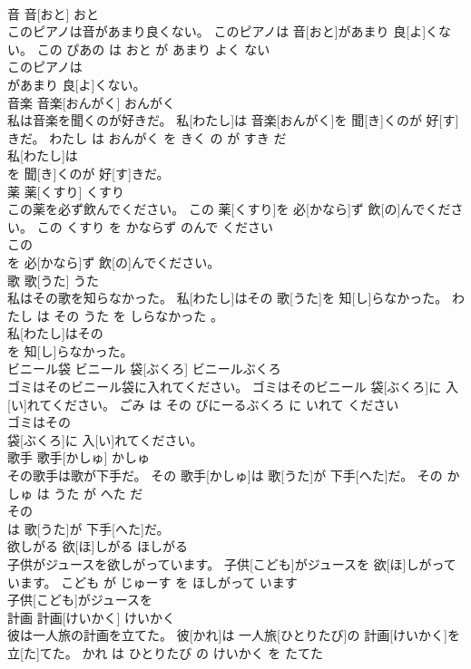 \documentclass[8pt]{extreport}
\begin{document}
\begin{CJK}{UTF8}{min}
\\	音	音[おと]	おと	
\\	このピアノは音があまり良くない。	このピアノは 音[おと]があまり 良[よ]くない。	この ぴあの は おと が あまり よく ない	
\\	このピアノは
\\	があまり 良[よ]くない。		
\\	音楽	音楽[おんがく]	おんがく	
\\	私は音楽を聞くのが好きだ。	私[わたし]は 音楽[おんがく]を 聞[き]くのが 好[す]きだ。	わたし は おんがく を きく の が すき だ	
\\	私[わたし]は
\\	を 聞[き]くのが 好[す]きだ。		
\\	薬	薬[くすり]	くすり	
\\	この薬を必ず飲んでください。	この 薬[くすり]を 必[かなら]ず 飲[の]んでください。	この くすり を かならず のんで ください	
\\	この
\\	を 必[かなら]ず 飲[の]んでください。		
\\	歌	歌[うた]	うた	
\\	私はその歌を知らなかった。	私[わたし]はその 歌[うた]を 知[し]らなかった。	わたし は その うた を しらなかった 。	
\\	私[わたし]はその
\\	を 知[し]らなかった。		
\\	ビニール袋	ビニール 袋[ぶくろ]	ビニールぶくろ	
\\	ゴミはそのビニール袋に入れてください。	ゴミはそのビニール 袋[ぶくろ]に 入[い]れてください。	ごみ は その びにーるぶくろ に いれて ください	
\\	ゴミはその
\\	袋[ぶくろ]に 入[い]れてください。		
\\	歌手	歌手[かしゅ]	かしゅ	
\\	その歌手は歌が下手だ。	その 歌手[かしゅ]は 歌[うた]が 下手[へた]だ。	その かしゅ は うた が へた だ	
\\	その
\\	は 歌[うた]が 下手[へた]だ。		
\\	欲しがる	欲[ほ]しがる	ほしがる	
\\	子供がジュースを欲しがっています。	子供[こども]がジュースを 欲[ほ]しがっています。	こども が じゅーす を ほしがって います	
\\	子供[こども]がジュースを
\\	計画	計画[けいかく]	けいかく	
\\	彼は一人旅の計画を立てた。	彼[かれ]は 一人旅[ひとりたび]の 計画[けいかく]を 立[た]てた。	かれ は ひとりたび の けいかく を たてた	

\end{CJK}
\end{document}

